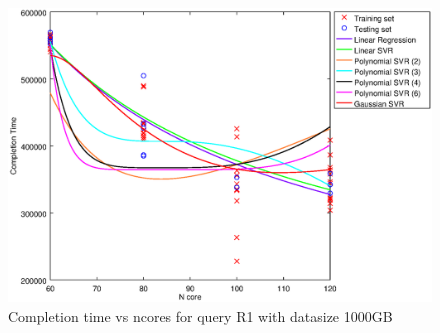 
\begin {figure}[hbtp]
\centering
\includegraphics[width=\textwidth]{output/R1_1000_ONLY_1_OVER_NCORES/plot_R1_1000.eps}
\caption{Completion time vs ncores for query R1 with datasize 1000GB}
\label{fig:all_nonlinear_R1_1000}
\end {figure}
